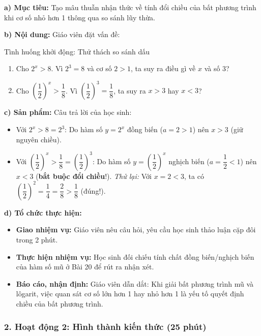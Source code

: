 \documentclass[12pt, a4paper]{article}
\begin{document}
\noindent \textbf{a) Mục tiêu:}
Tạo mâu thuẫn nhận thức về tính đổi chiều của bất phương trình khi cơ số nhỏ hơn 1 thông qua so sánh lũy thừa.

\noindent \textbf{b) Nội dung:}
Giáo viên đặt vấn đề:
\begin{pedabox}{Tình huống khởi động: Thử thách so sánh dấu}
\begin{enumerate}[leftmargin=0.6cm]
    \item Cho $2^x > 8$. Vì $2^3 = 8$ và cơ số $2 > 1$, ta suy ra điều gì về $x$ và số $3$?
    \item Cho $\left(\dfrac{1}{2}\right)^x > \dfrac{1}{8}$. Vì $\left(\dfrac{1}{2}\right)^3 = \dfrac{1}{8}$, ta suy ra $x > 3$ hay $x < 3$?
\end{enumerate}
\end{pedabox}

\noindent \textbf{c) Sản phẩm:}
Câu trả lời của học sinh:
\begin{itemize}
    \item Với $2^x > 8 = 2^3$: Do hàm số $y = 2^x$ đồng biến ($a = 2 > 1$) nên $x > 3$ (giữ nguyên chiều).
    \item Với $\left(\dfrac{1}{2}\right)^x > \dfrac{1}{8} = \left(\dfrac{1}{2}\right)^3$: Do hàm số $y = \left(\dfrac{1}{2}\right)^x$ nghịch biến ($a = \dfrac{1}{2} < 1$) nên $x < 3$ (\textbf{bắt buộc đổi chiều}!).
    \textit{Thử lại:} Với $x = 2 < 3$, ta có $\left(\dfrac{1}{2}\right)^2 = \dfrac{1}{4} = \dfrac{2}{8} > \dfrac{1}{8}$ (đúng!).
\end{itemize}

\noindent \textbf{d) Tổ chức thực hiện:}
\begin{itemize}[leftmargin=0.6cm]
    \item \textbf{Giao nhiệm vụ:} Giáo viên nêu câu hỏi, yêu cầu học sinh thảo luận cặp đôi trong 2 phút.
    \item \textbf{Thực hiện nhiệm vụ:} Học sinh đối chiếu tính chất đồng biến/nghịch biến của hàm số mũ ở Bài 20 để rút ra nhận xét.
    \item \textbf{Báo cáo, nhận định:} Giáo viên dẫn dắt: Khi giải bất phương trình mũ và lôgarit, việc quan sát cơ số lớn hơn 1 hay nhỏ hơn 1 là yếu tố quyết định chiều của bất phương trình.
\end{itemize}

\subsubsection*{2. Hoạt động 2: Hình thành kiến thức (25 phút)}
\end{document}
